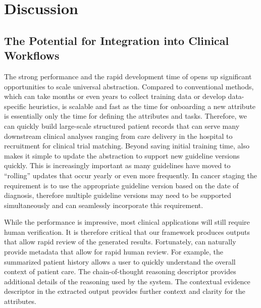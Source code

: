 
\section{Discussion}


\subsection{The Potential for \ours Integration into Clinical Workflows}

The strong performance and the rapid development time of \ours opens up significant opportunities to scale universal abstraction. Compared to conventional methods, which can take months or even years to collect training data or develop data-specific heuristics, \ours is scalable and fast as the time for onboarding a new attribute is essentially only the time for defining the attributes and tasks. Therefore, we can quickly build large-scale structured patient records that can serve many downstream clinical analyses ranging from care delivery in the hospital to recruitment for clinical trial matching. 
Beyond saving initial training time, \ours also makes it simple to update the abstraction to support new guideline versions quickly. This is increasingly important as many guidelines have moved to “rolling” updates that occur yearly or even more frequently. In cancer staging the requirement is to use the appropriate guideline version based on the date of diagnosis, therefore multiple guideline versions may need to be supported simultaneously and \ours can seamlessly incorporate this requirement. 

While the \ours performance is impressive, most clinical applications will still require human verification. It is therefore critical that our framework produces outputs that allow rapid review of the generated results. Fortunately, \ours can
naturally provide metadata that allow for rapid human review. For example, the summarized patient history allows a user to quickly understand the overall context of patient care. 
The chain-of-thought reasoning descriptor provides additional details of the reasoning used by the system. The contextual evidence descriptor in the extracted output provides further context and clarity for the attributes.

